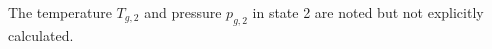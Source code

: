 The temperature \( T_{g,2} \) and pressure \( p_{g,2} \) in state 2 are noted but not explicitly calculated.